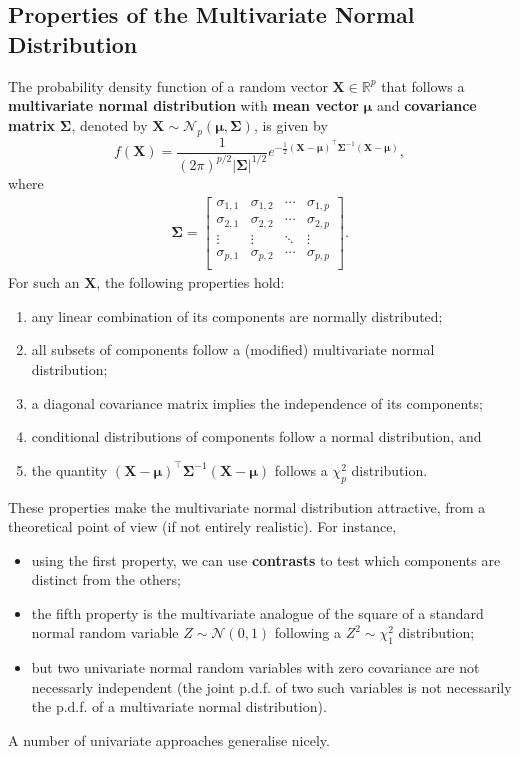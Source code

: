 \subsection{Properties of the Multivariate Normal Distribution}
The probability density function of a random vector $\mathbf{X}\in\mathbb{R}^p$ that follows a \textbf{multivariate normal distribution} with \textbf{mean vector} $\bm{\mu}$ and \textbf{covariance matrix} $\bm{\Sigma}$, denoted by $\bm{X}\sim\mathcal{N}_p(\bm{\mu},\bm{\Sigma})$, is given by 
\begin{equation*}
f(\bm{X})=\frac{1}{(2\pi)^{p/2}|\bm{\Sigma}|^{1/2}}e^{-\frac{1}{2}(\bm{X}-\bm{\mu})^{\!\top}\bm{\Sigma}^{-1}(\bm{X}-\bm{\mu})},
\end{equation*}
where
\begin{gather*}
    \bm{\Sigma}=
    \begin{bmatrix}
    \sigma_{1,1} & \sigma_{1,2} & \cdots & \sigma_{1,p}\\
    \sigma_{2,1} & \sigma_{2,2} & \cdots & \sigma_{2,p}\\
    \vdots & \vdots &  \ddots & \vdots\\
    \sigma_{p,1} & \sigma_{p,2} & \cdots & \sigma_{p,p}\\
    \end{bmatrix}.  
\end{gather*}
For such an $\bm{X}$, the following properties hold:
\begin{enumerate}[noitemsep]
    \item any linear combination of its components are normally distributed;
    \item all subsets of components follow a (modified) multivariate normal distribution;
    \item a diagonal covariance matrix implies the independence of its components;
    \item conditional distributions of components follow a normal distribution, and 
    \item the quantity $(\bm{X}-\bm{\mu})^{\!\top}\bm{\Sigma}^{-1}(\bm{X}-\bm{\mu})$ follows a $\chi^{2}_{p}$ distribution.
\end{enumerate}
These properties make the multivariate normal distribution attractive, from a theoretical point of view (if not entirely realistic). For instance, 
\begin{itemize}[noitemsep]
\item using the first property, we can use \textbf{contrasts} to test which components are distinct from the others; \item the fifth property is the multivariate analogue of the square of a standard normal random variable $Z\sim\mathcal{N}(0,1)$ following a $Z^2\sim \chi^2_1$ distribution;
\item but two univariate normal random variables with zero covariance are not necessarly independent (the joint p.d.f. of two such variables is not necessarily the p.d.f. of a multivariate normal distribution).
\end{itemize}
A number of univariate approaches generalise nicely. 
